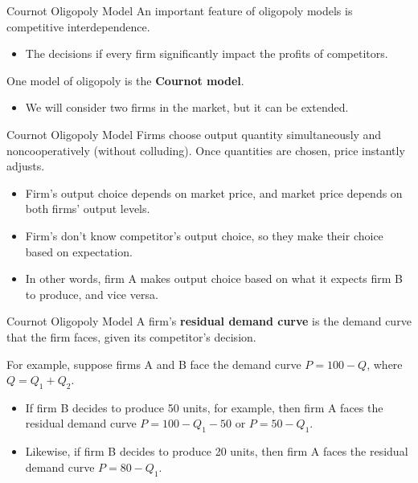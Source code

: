 \documentclass[11pt,t]{beamer}
\begin{document}
\begin{frame}{Cournot Oligopoly Model}
  An important feature of oligopoly models is competitive interdependence.

  \begin{itemize}
    \item The decisions if every firm significantly impact the profits of competitors.
  \end{itemize}

  \bigskip
  One model of oligopoly is the \textbf{Cournot model}.

  \begin{itemize}
    \item We will consider two firms in the market, but it can be extended.
  \end{itemize}
\end{frame}

\begin{frame}{Cournot Oligopoly Model}
  Firms choose output quantity simultaneously and noncooperatively (without colluding). Once quantities are chosen, price instantly adjusts.

  \begin{itemize}
    \item Firm's output choice depends on market price, and market price depends on both firms' output levels.

    \item Firm's don't know competitor's output choice, so they make their choice based on expectation.
  
    \item In other words, firm A makes output choice based on what it expects firm B to produce, and vice versa.
  \end{itemize}
\end{frame}

\begin{frame}{Cournot Oligopoly Model}
  A firm's \textbf{residual demand curve} is the demand curve that the firm faces, given its competitor's decision.

  \bigskip 
  For example, suppose firms A and B face the demand curve $P=100-Q$, where $Q = Q_1 + Q_2$.
  \begin{itemize}
    \item If firm B decides to produce 50 units, for example, then firm A faces the residual demand curve $P = 100 - Q_1 - 50$ or $P = 50 - Q_1$.
    \item Likewise, if firm B decides to produce 20 units, then firm A faces the residual demand curve $P = 80 - Q_1$.
  \end{itemize}
\end{frame}
\end{document}
